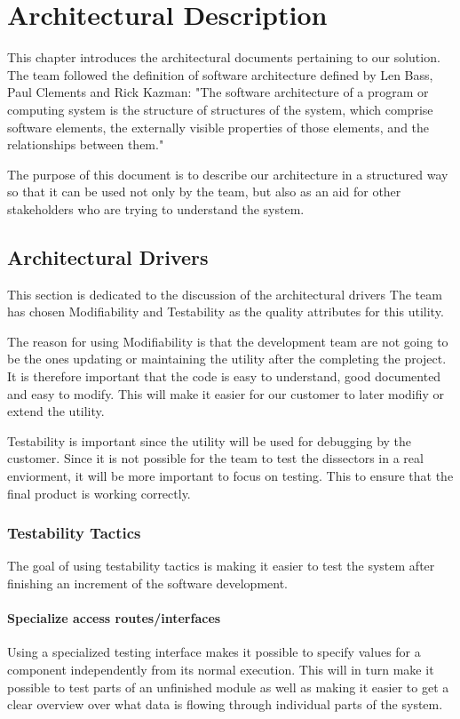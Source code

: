 \chapter{Architectural Description}
This chapter introduces the architectural documents pertaining to our solution. The team followed the definition of software architecture defined by Len Bass, Paul Clements and Rick Kazman: "The software architecture of a program or computing
system is the structure of structures of the system, which comprise software elements, the externally visible properties of those elements, and the relationships between them."

The purpose of this document is to describe our architecture in a structured way so that it can be used not only by the team, but also as an aid for other stakeholders who are trying to understand the system.


\section{Architectural Drivers}
This section is dedicated to the discussion of the architectural drivers
The team has chosen Modifiability and Testability as the quality attributes for this utility. 

The reason for using Modifiability is that the development team are not going to be the ones updating or maintaining the utility after the completing the project. It is therefore important that the code is easy to understand, good documented and easy to modify. This will make it easier for our customer to later modifiy or extend the utility.

Testability is important since the utility will be used for debugging by the customer.  Since it is not possible for the team to test the dissectors in a real enviorment, it will be more important to focus on testing. This to ensure that the final product is working correctly.

\subsection{Testability Tactics}
The goal of using testability tactics is making it easier to test the system after finishing an increment of the software development. 

\subsubsection{Specialize access routes/interfaces}
Using a specialized testing interface makes it possible to specify values for a component independently from its normal execution. This will in turn make it possible to test parts of an unfinished module as well as making it easier to get a clear overview over what data is flowing through individual parts of the system.

